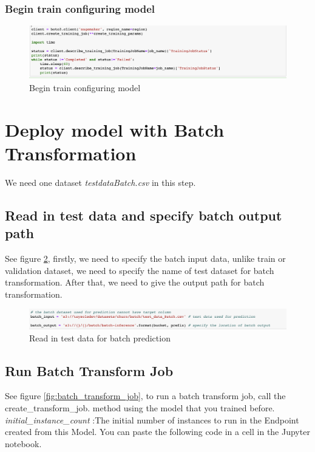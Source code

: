 \documentclass[12pt]{article}
\begin{document}
\subsubsection{Begin train configuring model}
\begin{figure}[H]
\centering
\begin{minipage}{1\textwidth}
  \centering
  \includegraphics[width=1\linewidth]{train_model_2.png}
   \caption{Begin train configuring model}
   \label{fig:train_model_2}
\end{minipage}%
\end{figure}
\noindent




\newpage
\section{Deploy model with Batch Transformation}
We need one dataset \textit{testdataBatch.csv} in this step.

\subsection{Read in test data and specify batch output path}
See figure \ref{fig:batch_test_input}, firstly, we need to specify the batch input data, unlike train or validation dataset, we need to specify the name of test dataset for batch transformation. After that, we need to give the output path for batch transformation.

\begin{figure}[H]
\centering
\begin{minipage}{1\textwidth}
  \centering
  \includegraphics[width=1\linewidth]{batch_test_input.png}
   \caption{Read in test data for batch prediction}
   \label{fig:batch_test_input}
\end{minipage}%
\end{figure}
\noindent

\subsection{Run Batch Transform Job}
See figure \ref{fig:batch_transform_job}, to run a batch transform job, call the create\_transform\_job. method using the model that you trained before. \textit{initial\_instance\_count} :The initial number of instances to run in the Endpoint created from this Model. You can paste the following code in a cell in the Jupyter notebook. 
\end{document}
